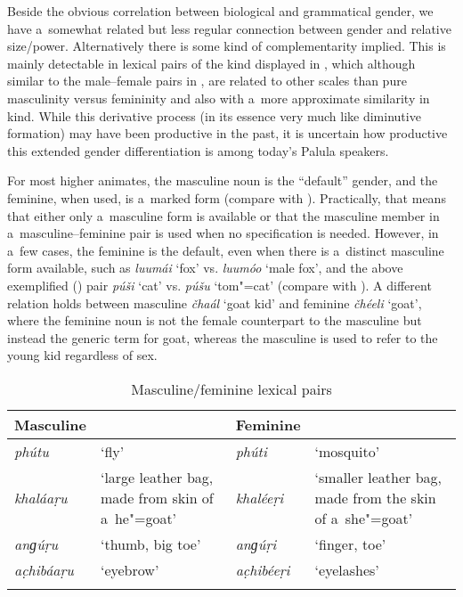 Beside the obvious correlation between biological and grammatical gender, we have a~somewhat related but less regular connection between gender and relative size/power. Alternatively there is some kind of complementarity implied. This is mainly detectable in lexical pairs of the kind displayed in , which although similar to the male--female pairs in , are related to other scales than pure masculinity versus femininity and also with a~more approximate similarity in kind. While this derivative process (in its essence very much like diminutive formation) may have been productive in the past, it is uncertain how productive this extended gender differentiation is among today's Palula speakers.

For most higher animates, the masculine noun is the ``default'' gender, and the feminine, when used, is a~marked form (compare with ). Practically, that means that either only a~masculine form is available or that the masculine member in a~masculine--feminine pair is used when no specification is needed. However, in a~few cases, the feminine is the default, even when there is a~distinct masculine form available, such as \textit{luumái} `fox' vs. \textit{luumóo} `male fox', and the above exemplified () pair \textit{púši} `cat' vs. \textit{púšu} `tom"=cat' (compare with \citealt[103--104]{dahl2000}). A different relation holds between masculine \textit{čhaál} `goat kid' and feminine \textit{čhéeli} `goat', where the feminine noun is not the female counterpart to the masculine but instead the generic term for goat, whereas the masculine is used to refer to the young kid regardless of sex.


\begin{table}[t]
\caption{Masculine/feminine lexical pairs}
\begin{tabularx}{\textwidth}{ l Q l Q }
\lsptoprule
Masculine &
&
Feminine &
\\\midrule
\textit{phútu} &
`fly' &
\textit{phúti} &
`mosquito'\\
\textit{khaláaṛu}
&
`large leather bag, made from skin of a~he"=goat' &
\textit{khaléeṛi}
&
`smaller leather bag, made from the skin of a~she"=goat'\\
\textit{anɡúṛu} &
`thumb, big toe' &
\textit{anɡúṛi} &
`finger, toe'\\
\textit{ac̣hibáaṛu} &
`eyebrow' &
\textit{ac̣hibéeṛi} &
`eyelashes'\\\lspbottomrule
\end{tabularx}
\label{tab:4-2}
\end{table}

